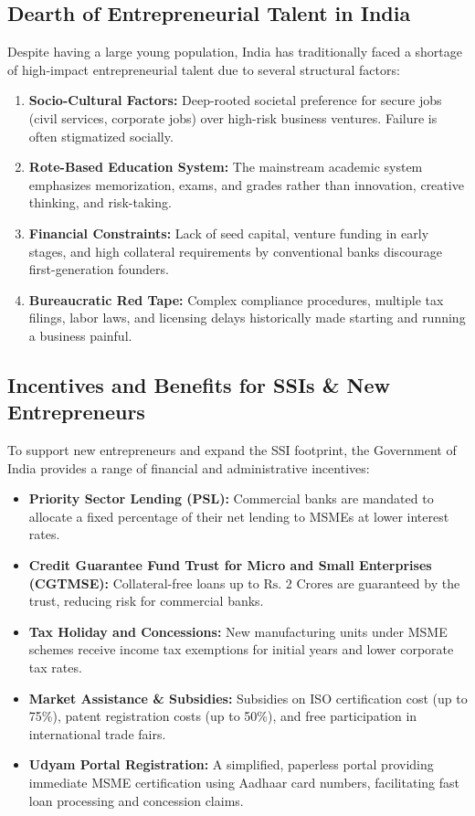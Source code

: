 \documentclass[12pt,a4paper]{article}
\begin{document}
\subsection{Dearth of Entrepreneurial Talent in India}
Despite having a large young population, India has traditionally faced a shortage of high-impact entrepreneurial talent due to several structural factors:
\begin{enumerate}[label=\textbf{\alph*.}, leftmargin=*, itemsep=2.5pt]
  \item \textbf{Socio-Cultural Factors:} Deep-rooted societal preference for secure jobs (civil services, corporate jobs) over high-risk business ventures. Failure is often stigmatized socially.
  \item \textbf{Rote-Based Education System:} The mainstream academic system emphasizes memorization, exams, and grades rather than innovation, creative thinking, and risk-taking.
  \item \textbf{Financial Constraints:} Lack of seed capital, venture funding in early stages, and high collateral requirements by conventional banks discourage first-generation founders.
  \item \textbf{Bureaucratic Red Tape:} Complex compliance procedures, multiple tax filings, labor laws, and licensing delays historically made starting and running a business painful.
\end{enumerate}

\subsection{Incentives and Benefits for SSIs \& New Entrepreneurs}
To support new entrepreneurs and expand the SSI footprint, the Government of India provides a range of financial and administrative incentives:

\begin{tcolorbox}[formulabox, title={Key Incentives \& Support Programs}]
\begin{itemize}[leftmargin=*, itemsep=2pt, topsep=0pt]
  \item \textbf{Priority Sector Lending (PSL):} Commercial banks are mandated to allocate a fixed percentage of their net lending to MSMEs at lower interest rates.
  \item \textbf{Credit Guarantee Fund Trust for Micro and Small Enterprises (CGTMSE):} Collateral-free loans up to $\text{Rs. } 2\text{ Crores}$ are guaranteed by the trust, reducing risk for commercial banks.
  \item \textbf{Tax Holiday and Concessions:} New manufacturing units under MSME schemes receive income tax exemptions for initial years and lower corporate tax rates.
  \item \textbf{Market Assistance \& Subsidies:} Subsidies on ISO certification cost (up to 75\%), patent registration costs (up to 50\%), and free participation in international trade fairs.
  \item \textbf{Udyam Portal Registration:} A simplified, paperless portal providing immediate MSME certification using Aadhaar card numbers, facilitating fast loan processing and concession claims.
\end{itemize}
\end{tcolorbox}
\end{document}
